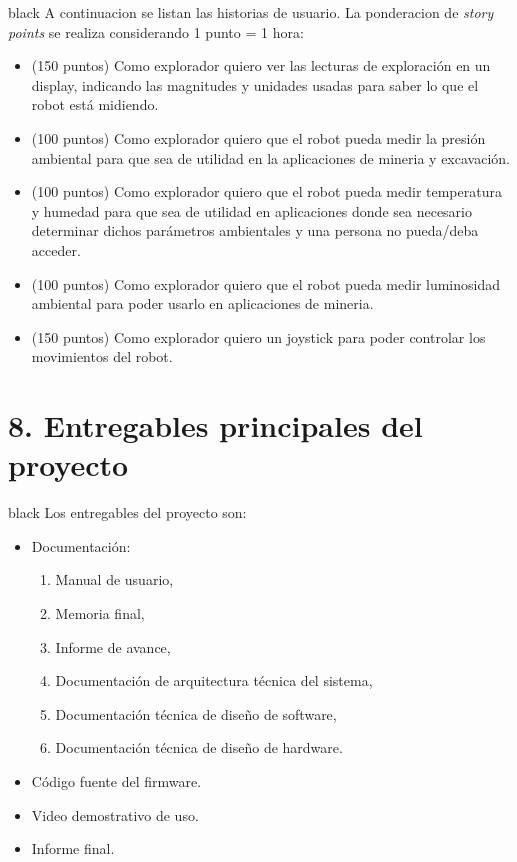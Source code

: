 \documentclass[
11pt, %
codirector, %
]{charter}
\begin{document}
\begin{consigna}{black}
A continuacion se listan las historias de usuario. La ponderacion de \textit{story points} se realiza considerando 1 punto = 1 hora:
\begin{itemize}
	\item (150 puntos) Como explorador quiero ver las lecturas de exploración en un display, indicando las magnitudes y unidades usadas para saber lo que el robot está midiendo.
	\item (100 puntos) Como explorador quiero que el robot pueda medir la presión ambiental para que sea de utilidad en la aplicaciones de mineria y excavación.
	\item (100 puntos) Como explorador quiero que el robot pueda medir temperatura y humedad para que sea de utilidad en aplicaciones donde sea necesario determinar dichos parámetros ambientales y una persona no pueda/deba acceder.
	\item (100 puntos) Como explorador quiero que el robot pueda medir luminosidad ambiental para poder usarlo en aplicaciones de mineria.
	\item (150 puntos) Como explorador quiero un joystick para poder controlar los movimientos del robot.
\end{itemize}
\end{consigna}

\section{8. Entregables principales del proyecto}
\label{sec:entregables}
\begin{consigna}{black}
Los entregables del proyecto son:
\begin{itemize}
	\item Documentación:
	\begin{enumerate}				
		\item Manual de usuario,			
		\item Memoria final,
		\item Informe de avance,
		\item Documentación de arquitectura técnica del sistema,
		\item Documentación técnica de diseño de software,
		\item Documentación técnica de diseño de hardware.						
	\end{enumerate}	
	\item Código fuente del firmware.
	\item Video demostrativo de uso. 
	\item Informe final.
\end{itemize}
\end{consigna}
\end{document}
